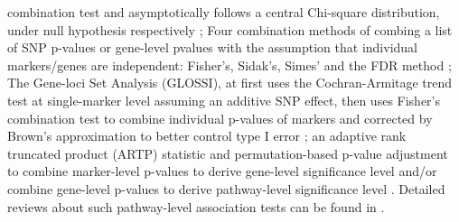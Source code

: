 \documentclass[12pt]{article}
\begin{document}
combination test and asymptotically follows a central Chi-square distribution, under null hypothesis respectively \cite{Luo2010}; Four combination methods of combing a list of SNP p-values or gene-level pvalues with the assumption that individual markers/genes are independent: Fisher's, Sidak's, Simes' and the FDR method \cite{peng2009gene}; The Gene-loci Set Analysis (GLOSSI), at first uses the Cochran-Armitage trend test at single-marker level assuming an additive SNP effect, then uses Fisher's combination test to combine individual p-values of markers and corrected by Brown's approximation to better control type I error \cite{Chai2009}; an adaptive rank truncated product (ARTP) statistic and permutation-based p-value adjustment to combine marker-level p-values to derive gene-level significance level and/or combine gene-level p-values to derive pathway-level significance level \cite{Yu2009}. Detailed reviews about such pathway-level association tests can be found in \cite{tintle2011inflated,Wang2010,Fridley2011}. 
\end{document}
